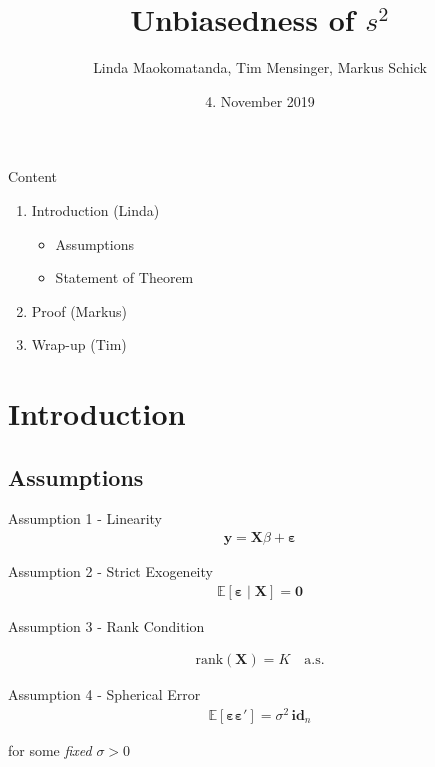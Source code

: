 \documentclass{beamer}
\title{Unbiasedness of $s^2$}
\author{Linda Maokomatanda, Tim Mensinger, Markus Schick}
\institute{University of Bonn}
\date{4. November 2019}
\begin{document}
\begin{frame}
    \titlepage
\end{frame}

\begin{frame}{Content}
\fontsize{15pt}{10}\selectfont
\begin{enumerate}
    \item Introduction (Linda)
        \begin{itemize}[]
\fontsize{14pt}{7.2}\selectfont
            \item[] Assumptions 
            \item[] Statement of Theorem
        \end{itemize}
    \item Proof (Markus)
    \item Wrap-up (Tim)
\end{enumerate}
\end{frame}

\section{Introduction}
\subsection{Assumptions}

\begin{frame}{Assumption 1 - Linearity}
\fontsize{15pt}{10}\selectfont
    \begin{align*}
    \bm{y} = \mathbf{X} \beta + \bm{\varepsilon}
    \end{align*}
\end{frame}

\begin{frame}{Assumption 2 - Strict Exogeneity}
\fontsize{15pt}{10}\selectfont
\begin{align*}
    \mathbb{E}\left [\bm{\varepsilon} \mid \mathbf{X} \right] = \mathbf{0}
\end{align*}
\end{frame}

\begin{frame}{Assumption 3 - Rank Condition}

\fontsize{15pt}{10}\selectfont
\begin{align*}
    \text{rank}(\mathbf{X})=K\quad\text{a.s.}
\end{align*}
\end{frame}

\begin{frame}{Assumption 4 - Spherical Error}
\fontsize{15pt}{10}\selectfont
    \begin{align*}
     \mathbb{E}\left[\bm{\varepsilon} \bm{\varepsilon}' \right] = \sigma^2 \, \mathbf{id}_n
    \end{align*}
    \begin{center}
        for some \emph{fixed} $\sigma > 0$ 
    \end{center}
\end{frame}
\end{document}
